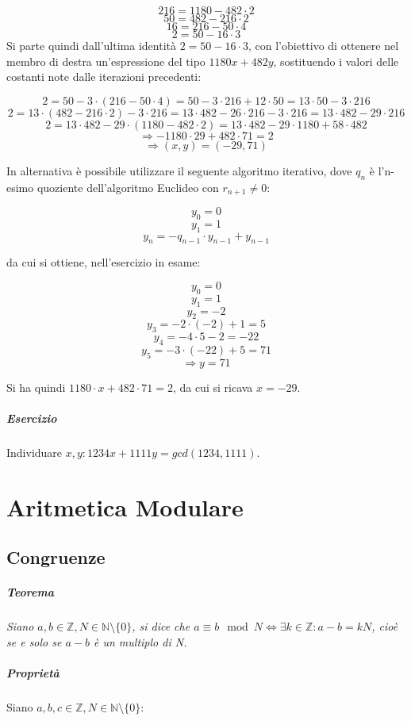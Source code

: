 \documentclass[a4paper]{report}
\begin{document}
$$216=1180-482\cdot 2$$
$$50=482-216\cdot 2$$
$$16=216-50\cdot 4$$
$$2=50-16\cdot 3$$
Si parte quindi dall'ultima identità $2=50-16\cdot 3$, con l'obiettivo di ottenere nel membro di destra un'espressione del tipo $1180x+482y$, sostituendo i valori delle costanti note dalle iterazioni precedenti:

$$2=50-3\cdot(216-50\cdot 4)=50-3\cdot 216 + 12\cdot 50=13\cdot 50 - 3\cdot 216$$
$$2=13\cdot (482-216\cdot2) - 3\cdot 216=13\cdot 482 -26\cdot 216-3\cdot 216=13\cdot 482 -29\cdot 216$$
$$2=13\cdot 482 - 29\cdot (1180-482\cdot 2)=13\cdot 482-29\cdot 1180 + 58\cdot 482$$
$$\Rightarrow - 1180\cdot 29 + 482\cdot 71 = 2 $$
$$\Rightarrow (x,y)=(-29,71)$$

In alternativa è possibile utilizzare il seguente algoritmo iterativo, dove $q_n$ è l'n-esimo quoziente dell'algoritmo Euclideo con $r_{n+1}\neq 0$:

$$y_0=0$$
$$y_1=1$$
$$y_n=-q_{n-1}\cdot y_{n-1}+y_{n-1}$$

da cui si ottiene, nell'esercizio in esame:

$$y_0=0$$
$$y_1=1$$
$$y_2=-2$$
$$y_3=-2\cdot (-2)+1=5$$
$$y_4=-4\cdot5-2=-22$$
$$y_5=-3\cdot (-22)+5=71$$
$$\Rightarrow y=71$$

Si ha quindi $1180\cdot x + 482\cdot 71 = 2$, da cui si ricava $x=-29$.

\paragraph{Esercizio} Individuare $x,y:1234x+1111y=gcd(1234,1111)$.
\chapter{Aritmetica Modulare}
\section{Congruenze}
\paragraph{Teorema}
\textit{Siano $a,b\in \mathbb{Z}, N\in \mathbb{N}\setminus \{ 0\} $, si dice che $a\equiv b \mod{N} \Leftrightarrow \exists k\in \mathbb{Z}:a-b=kN$, cioè se e solo se $a-b$ è un multiplo di N.}
\paragraph{Proprietà} Siano $a,b,c\in \mathbb{Z}, N\in \mathbb{N}\setminus \{ 0\} $:
\end{document}
